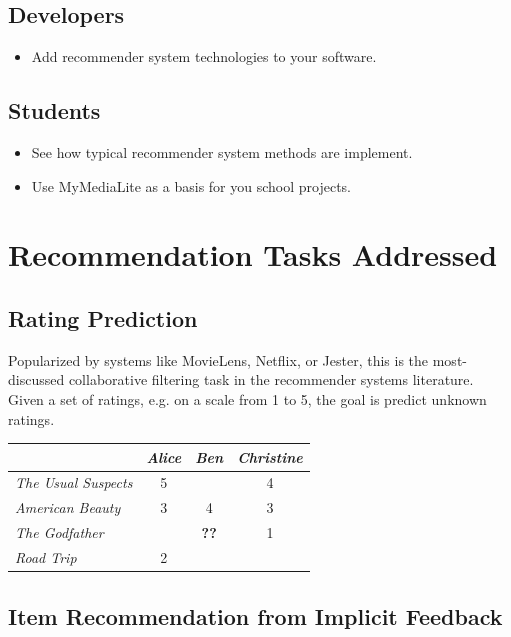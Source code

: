 \documentclass[a4paper, foldmark, 12pt]{leaflet}
\newcommand{\UserI}{\textit{Alice}}
\newcommand{\UserII}{\textit{Ben}}
\newcommand{\UserIII}{\textit{Christine}}
\newcommand{\MovieI}{\textit{The Usual Suspects}}
\newcommand{\MovieII}{\textit{American Beauty}}
\newcommand{\MovieIII}{\textit{The Godfather}}
\newcommand{\MovieIV}{\textit{Road Trip}}
\begin{document}
\subsection{Developers}
\begin{itemize}
	\item Add recommender system technologies to your software.
\end{itemize}

\subsection{Students}
\begin{itemize}
	\item See how typical recommender system methods are implement.
	\item Use MyMediaLite as a basis for you school projects.
\end{itemize}

\newpage

\section{Recommendation Tasks Addressed}

\subsection{Rating Prediction}

Popularized by systems like MovieLens, Netflix, or Jester,
this is the most-discussed collaborative filtering task in the
recommender systems literature.
Given a set of ratings, e.g. on a scale from 1 to 5,
the goal is predict unknown ratings.

\begin{center}
      \begin{tabular}{|l||c|c|c|}
        \hline
	           & \UserI & \UserII & \UserIII \\ \hline
	\hline
	\MovieI    &  5   &     & 4     \\ \hline
	\MovieII   &  3   & 4   & 3    \\ \hline
	\MovieIII  &      & \textbf{??}    & 1    \\ \hline
	\MovieIV   &  2   &     &        \\ \hline
      \end{tabular}
\end{center}


\subsection{Item Recommendation from Implicit Feedback}
\end{document}
